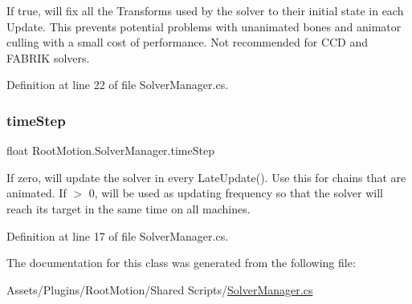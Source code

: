 If true, will fix all the Transforms used by the solver to their initial state in each Update. This prevents potential problems with unanimated bones and animator culling with a small cost of performance. Not recommended for C\+CD and F\+A\+B\+R\+IK solvers. 



Definition at line 22 of file Solver\+Manager.\+cs.

\mbox{\label{class_root_motion_1_1_solver_manager_a7fc2aab2764fc8e4da5cd714d887801d}} 
\subsubsection{\texorpdfstring{time\+Step}{timeStep}}
{\footnotesize\ttfamily float Root\+Motion.\+Solver\+Manager.\+time\+Step}



If zero, will update the solver in every Late\+Update(). Use this for chains that are animated. If $>$ 0, will be used as updating frequency so that the solver will reach its target in the same time on all machines. 



Definition at line 17 of file Solver\+Manager.\+cs.



The documentation for this class was generated from the following file\+:\begin{DoxyCompactItemize}
\item 
Assets/\+Plugins/\+Root\+Motion/\+Shared Scripts/\mbox{\hyperlink{_solver_manager_8cs}{Solver\+Manager.\+cs}}\end{DoxyCompactItemize}
